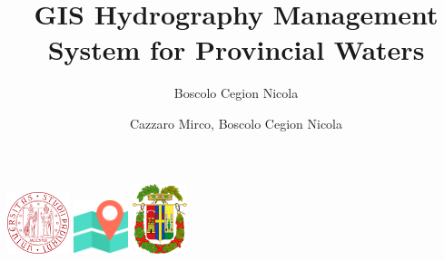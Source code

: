 \documentclass[a4paper, 11pt]{article}
\title{GIS Hydrography Management System for Provincial Waters}
\author{Boscolo Cegion Nicola}
\author{Cazzaro Mirco, Boscolo Cegion Nicola}
\begin{document}
\maketitle
\begin{center}
    \includegraphics[width = 18mm]{img/unipd.png}
    \hspace{10mm}
    \includegraphics[width = 16mm]{img/map.png}
    \hspace{10mm}
    \includegraphics[width = 16mm]{img/belluno.png}
\end{center}
\tableofcontents







\end{document}
